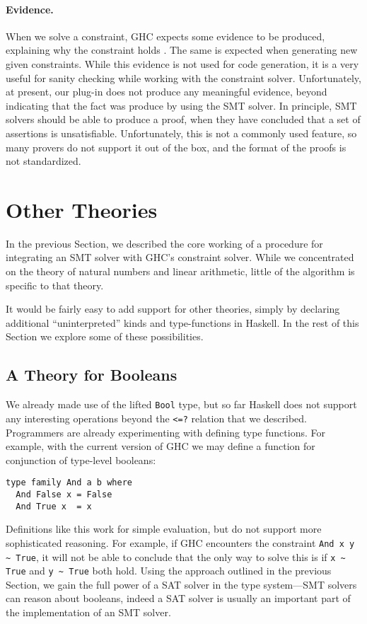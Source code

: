 \documentclass{sigplanconf}
\begin{document}
\paragraph{Evidence.} When we solve a constraint, GHC expects some
evidence to be produced, explaining why the constraint holds
\cite{fc-evidence}.  The same is expected when generating new given
constraints.  While this evidence is not used for code generation,
it is a very useful for sanity checking while working with the constraint
solver.  Unfortunately, at present, our plug-in does not produce any
meaningful evidence, beyond indicating that the fact was produce
by using the SMT solver. In principle, SMT solvers should be able to
produce a proof, when they have concluded that a set of assertions
is unsatisfiable.  Unfortunately, this is not a commonly used feature,
so many provers do not support it out of the box, and the format of the
proofs is not standardized.


\section{Other Theories}
\label{other}

In the previous Section, we described the core working of a procedure
for integrating an SMT solver with GHC's constraint solver.  While
we concentrated on the theory of natural numbers and linear arithmetic,
little of the algorithm is specific to that theory.

It would be fairly easy to add support for other theories, simply
by declaring additional ``uninterpreted'' kinds and type-functions
in Haskell.  In the rest of this Section we explore some of these
possibilities.

\subsection{A Theory for Booleans}
We already made use of the lifted \Verb"Bool" type, but so far Haskell
does not support any interesting operations beyond the \Verb"<=?" relation
that we described.  Programmers are already experimenting with defining
type functions. For example, with the current version of GHC we may
define a function for conjunction of type-level booleans:
\begin{Verbatim}
type family And a b where
  And False x = False
  And True x  = x
\end{Verbatim}

Definitions like this work for simple evaluation, but do not support
more sophisticated reasoning.  For example, if GHC encounters
the constraint \Verb"And x y ~ True", it will not be able to conclude
that the only way to solve this is if \Verb"x ~ True" and \Verb"y ~ True"
both hold.  Using the approach outlined in the previous Section, we
gain the full power of a SAT solver in the type system---SMT solvers
can reason about booleans, indeed a SAT solver is usually an important
part of the implementation of an SMT solver.
\end{document}
